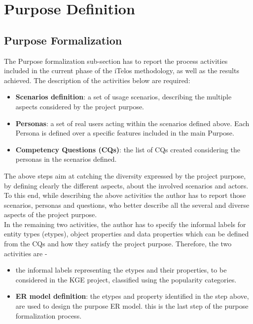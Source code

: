\section{Purpose Definition}

\subsection{Purpose Formalization}
The Purpose formalization sub-section has to report the process activities included in the current phase of the iTelos methodology, as well as the results achieved. The description of the activities below are required:
        \begin{itemize}
            \item \textbf{Scenarios definition}: a set of usage scenarios, describing the multiple aspects considered by the project purpose.
            \item \textbf{Personas}: a set of real users acting  within the scenarios defined above. Each Persona is defined over a specific features included in the main Purpose.  
            \item \textbf{Competency Questions (CQs)}: the list of CQs created considering the personas in the scenarios defined.
        \end{itemize}

\noindent The above steps aim at catching the diversity expressed by the project purpose, by defining clearly the different aspects, about the involved scenarios and actors. To this end, while describing the above activities the author has to report those scenarios, personas and questions, who better describe all the several and diverse aspects of the project purpose.\\

\noindent In the remaining two activities, the author has to specify the informal labels for entity types (etypes), object properties and data properties which can be defined from the CQs and how they satisfy the project purpose. Therefore, the two activities are - 
        
        \begin{itemize}
            \item the informal labels representing the etypes and their properties, to be considered in the KGE project, classified using the popularity categories.
            \item  \textbf{ER model definition}: the etypes and property identified in the step above, are used to design the purpose ER model. this is the last step of the purpose formalization process.
        \end{itemize}


